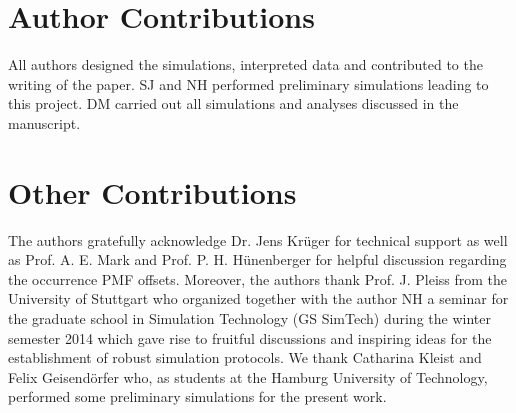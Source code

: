 \documentclass[9pt,lessons]{livecoms}
\newcommand{\githubrepository}{\url{https://github.com/myaccount/homegithubrepository}}  %
\begin{document}
\section{Author Contributions}
%

All authors designed the simulations, interpreted data and contributed to the writing of the paper. 
SJ and NH performed preliminary simulations leading to this project. DM carried out all simulations and analyses discussed in the manuscript.


\section{Other Contributions}
%

The authors gratefully acknowledge Dr. Jens Kr\"uger for technical support as well as Prof. A. E. Mark and Prof. P. H. H\"unenberger for helpful discussion regarding the occurrence PMF offsets.
Moreover,  the authors thank  Prof. J. Pleiss from the University of Stuttgart who organized together with the author NH a seminar for the graduate school in Simulation Technology (GS SimTech)
during the winter semester 2014  which gave rise to fruitful discussions and inspiring ideas for the establishment of robust simulation protocols.
We thank Catharina Kleist and Felix Geisend\"orfer who, as students at the Hamburg University of Technology, performed some preliminary simulations for the present work.
\end{document}
